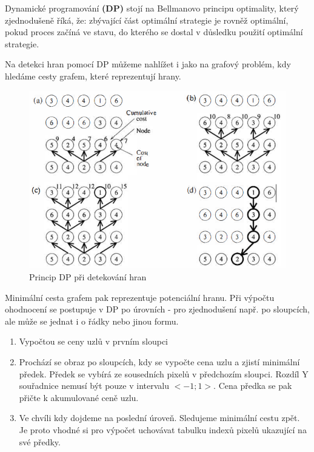\documentclass[12pt,a4paper,titlepage,final]{report}
\begin{document}
Dynamické programování \textbf{(DP)} stojí na Bellmanovo principu optimality, který zjednodušeně říká, že: zbývající část optimální strategie je rovněž optimální, pokud proces začíná ve stavu, do kterého se dostal v důsledku použití optimální strategie.

Na detekci hran pomocí DP můžeme nahlížet i jako na grafový problém, kdy hledáme cesty grafem, které reprezentují hrany.

\begin{figure}[ht]
\begin{center}
\includegraphics[width=12cm]{images/theory.png}
\caption{Princip DP při detekování hran}
\label{fig:theory}
\end{center}
\end{figure}

Minimální cesta grafem pak reprezentuje potenciální hranu. Při výpočtu ohodnocení se postupuje v DP po úrovních - pro zjednodušení např. po sloupcích, ale může se jednat i o řádky nebo jinou formu.

\begin{enumerate}
	\item Vypočtou se ceny uzlů v prvním sloupci
	\item Prochází se obraz po sloupcích, kdy se vypočte cena uzlu a zjistí minimální předek. Předek se vybírá ze sousedních pixelů v předchozím sloupci. Rozdíl Y souřadnice nemusí být pouze v intervalu $<-1;1>$. Cena předka se pak přičte k akumulované ceně uzlu.
	\item Ve chvíli kdy dojdeme na poslední úroveň. Sledujeme minimální cestu zpět. Je proto vhodné si pro výpočet uchovávat tabulku indexů pixelů ukazující na své předky.
\end{enumerate}
\end{document}

